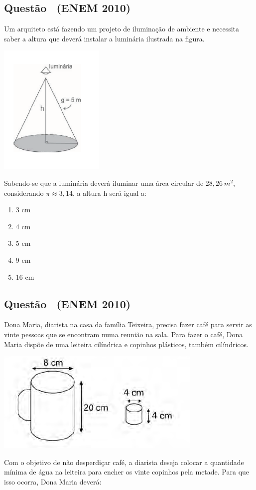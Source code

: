 \documentclass[12pt]{article}
\newif\ifmostravermelho
\newcommand{\vermelho}[1]{%
  \ifmostravermelho
    {\color{red}#1}%
  \else
    #1%
  \fi
}
\newcounter{questao}
\newcommand{\novaquestao}[1]{%
  \stepcounter{questao}%
  \subsection*{Questão \thequestao\ (#1)}%
}
\begin{document}
\begin{multicols}{2}
        \novaquestao{ENEM 2010}
            Um arquiteto está fazendo um projeto de iluminação de ambiente e necessita saber a altura que deverá instalar a luminária ilustrada na figura.

            \begin{center}
                \includegraphics[scale=0.6]{q30.png}
            \end{center} Sabendo-se que a luminária deverá iluminar uma área circular de $28,26\ m^{2}$, considerando $\pi \approx 3,14$, a altura h será igual a:
        
            \begin{enumerate}[label=(\alph*), noitemsep]
                \item 3  cm
                \item \vermelho{4  cm} %
                \item 5  cm
                \item 9  cm
                \item 16  cm 
            \end{enumerate}

        \novaquestao{ENEM 2010}
            Dona Maria, diarista na casa da família Teixeira, precisa fazer café para servir as vinte pessoas que se encontram numa reunião na sala. Para fazer o café, Dona Maria dispõe de uma leiteira cilíndrica e copinhos plásticos, também cilíndricos.

            \begin{center}
                \includegraphics[scale=0.6]{q31.png}
            \end{center} Com o objetivo de não desperdiçar café, a diarista deseja colocar a quantidade mínima de água na leiteira para encher os vinte copinhos pela metade. Para que isso ocorra, Dona Maria deverá:


\end{multicols}
\end{document}
